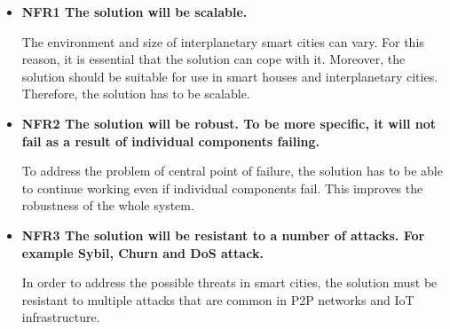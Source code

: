 \begin{itemize}
\item \textbf{NFR1 The solution will be scalable.}
\label{NFR1}

\quad The environment and size of interplanetary smart cities can vary. For this reason, it is essential that the solution can cope with it. Moreover, the solution should be suitable for use in smart houses and interplanetary cities. Therefore, the solution has to be scalable.

\item \textbf{NFR2 The solution will be robust. To be more specific, it will not fail as a result of individual components failing.}
\label{NFR2}

\quad To address the problem of central point of failure, the solution has to be able to continue working even if individual components fail. This improves the robustness of the whole system.

\item \textbf{NFR3 The solution will be resistant to a number of attacks. For example Sybil, Churn and DoS attack.}
\label{NFR3}

\quad In order to address the possible threats in smart cities, the solution must be resistant to multiple attacks that are common in P2P networks and IoT infrastructure.

\end{itemize}

%
%
